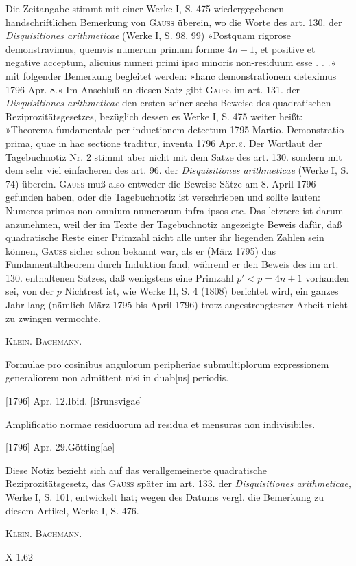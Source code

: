 \medskip\begingroup\small
\indent Die Zeitangabe stimmt mit einer Werke I, S. 475 wiedergegebenen handschriftlichen Bemerkung von \textsc{Gauss} überein, wo die Worte des art. 130. der \textit{Disquisitiones arithmeticae} (Werke I, S. 98, 99) »Postquam rigorose demonstravimus, quemvis numerum primum formae \(4n+1\), et positive et negative acceptum, alicuius numeri primi ipso minoris non-residuum esse \(\ldotp\,\ldotp\,\ldotp\)« mit folgender Bemerkung begleitet werden: »hanc demonstrationem deteximus 1796 Apr. 8.« Im Anschluß an diesen Satz gibt \textsc{Gauss} im art. 131. der \textit{Disquisitiones arithmeticae} den ersten seiner sechs Beweise des quadratischen Reziprozitätsgesetzes, bezüglich dessen es Werke I, S. 475 weiter heißt: »Theorema fundamentale per inductionem detectum 1795 Martio. Demonstratio prima, quae in hac sectione traditur, inventa 1796 Apr.«. Der Wortlaut der Tagebuchnotiz Nr. 2 stimmt aber nicht mit dem Satze des art. 130. sondern mit dem sehr viel einfacheren des art. 96. der \textit{Disquisitiones arithmeticae} (Werke I, S. 74) überein. \textsc{Gauss} muß also entweder die Beweise  Sätze am 8. April 1796 gefunden haben, oder die Tagebuchnotiz ist verschrieben und sollte lauten: Numeros primos non omnium numerorum infra ipsos etc. Das letztere ist darum anzunehmen, weil der im Texte der Tagebuchnotiz angezeigte Beweis dafür, daß quadratische Reste einer Primzahl nicht alle unter ihr liegenden Zahlen sein können, \textsc{Gauss} sicher schon bekannt war, als er (März 1795) das Fundamentaltheorem durch Induktion fand, während er den Beweis des im art. 130. enthaltenen Satzes, daß wenigstens eine Primzahl \(p'<p=4n+1\) vorhanden sei, von der \(p\) Nichtrest ist, wie Werke II, S. 4 (1808) berichtet wird, ein ganzes Jahr lang (nämlich März 1795 bis April 1796) trotz angestrengtester Arbeit nicht zu zwingen vermochte.
\par\noindent\hfill\textsc{Klein. Bachmann.}
\par\endgroup

\indent Formulae pro cosinibus angulorum peripheriae submultiplorum expressionem generaliorem non admittent nisi in duab[us] periodis.
\par\noindent\hfill[1796] Apr. 12.\quad Ibid. [Brunsvigae]

\indent Amplificatio normae residuorum ad residua et mensuras non indivisibiles.
\par\noindent\hfill[1796] Apr. 29.\quad Götting[ae]

\medskip\begingroup\small
\indent Diese Notiz bezieht sich auf das verallgemeinerte quadratische Reziprozitätsgesetz, das \textsc{Gauss} später im art. 133. der \textit{Disquisitiones arithmeticae}, Werke I, S. 101, entwickelt hat; wegen des Datums vergl. die Bemerkung zu diesem Artikel, Werke I, S. 476.
\par\noindent\hfill\textsc{Klein. Bachmann.}
\par\endgroup
\par\vfill\noindent\small X 1.\hfill62\hspace*{.43\linewidth}\normalsize

